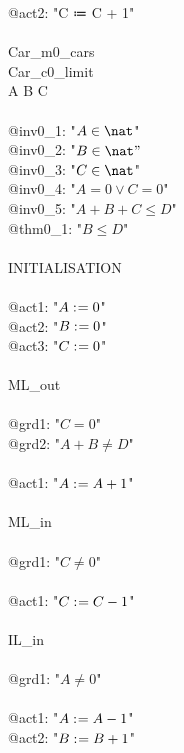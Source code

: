 \begin{description}
\begin{center}
\begin{Bcode}
			@act2: "C ≔ C + 1"\\
			\Bend\\
			\Bend
			\else
			\Bmachine{} Car_m0_cars\\
			\Bsees{} Car_c0_limit\\
			\Bvariables{} A B C\\
			\Binvariants\\
			\Btab @inv0_1: "\(A \in \nat\)"\\
			\Btab @inv0_2: "\(B \in \nat"\)\\
			\Btab @inv0_3: "\(C \in \nat\)"\\
			\Btab @inv0_4: "\(A = 0 \vee C = 0\)"\\
			\Btab @inv0_5: "\(A + B + C \leq D\)"\\
			\Btab @thm0_1: "\(B \leq D\)" \Btheorem\\
			\Bevents\\
			\Btab INITIALISATION\\
			\Btab \Bbegin\\
			\Btab \Btab @act1: "\(A \mathrel{:\mkern1mu=} 0\)"\\
			\Btab \Btab @act2: "\(B \mathrel{:\mkern1mu=} 0\)"\\
			\Btab \Btab @act3: "\(C \mathrel{:\mkern1mu=} 0\)"\\
			\Btab \Bend\\
			\Btab ML_out\\
			\Btab \Bwhen\\
			\Btab \Btab @grd1: "\(C = 0\)"\\
			\Btab \Btab @grd2: "\(A + B \neq D\)"\\
			\Btab \Bthen\\
			\Btab \Btab @act1: "\(A \mathrel{:\mkern1mu=} A + 1\)"\\
			\Btab \Bend\\
			\Btab ML_in\\
			\Btab \Bwhen\\
			\Btab \Btab @grd1: "\(C \neq 0\)"\\
			\Btab \Bthen\\
			\Btab \Btab @act1: "\(C \mathrel{:\mkern1mu=} C - 1\)"\\
			\Btab \Bend\\
			\Btab IL_in\\
			\Btab \Bwhen\\
			\Btab \Btab @grd1: "\(A \neq 0\)"\\
			\Btab \Bthen\\
			\Btab \Btab @act1: "\(A \mathrel{:\mkern1mu=} A - 1\)"\\
			\Btab \Btab @act2: "\(B \mathrel{:\mkern1mu=} B + 1\)"\\

\end{Bcode}
\end{center}
\end{description}

